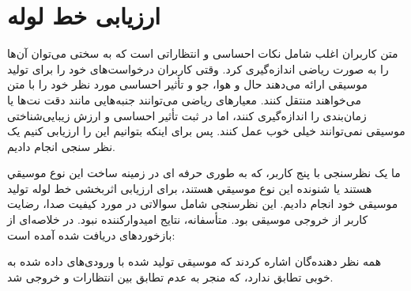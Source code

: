 \section{ارزیابی خط لوله}
متن کاربران اغلب شامل نکات احساسی و انتظاراتی است که به سختی می‌توان آن‌ها را به صورت ریاضی اندازه‌گیری کرد. وقتی کاربران درخواست‌های خود را برای تولید موسیقی ارائه می‌دهند حال و هوا، جو و تأثیر احساسی مورد نظر خود را با متن می‌خواهند منتقل کنند. معیارهای ریاضی می‌توانند جنبه‌هایی مانند دقت نت‌ها یا زمان‌بندی را اندازه‌گیری کنند، اما در ثبت تأثیر احساسی و ارزش زیبایی‌شناختی موسیقی نمی‌توانند خیلی خوب عمل کنند. پس برای اینکه بتوانیم این  را ارزیابی کنیم یک  نظر سنجی انجام دادیم.

ما یک نظرسنجی با پنج کاربر، که به طوری حرفه ای در زمینه ساخت این نوع موسیقي هستند یا شنونده این نوع موسیقي هستند، برای ارزیابی اثربخشی
خط لوله تولید موسیقی خود انجام دادیم. این نظرسنجی شامل سوالاتی در مورد
کیفیت صدا، رضایت کاربر از خروجی موسیقی بود. متأسفانه، نتایج امیدوارکننده
نبود. در  خلاصه‌ای از بازخوردهای دریافت شده آمده است:

\begin{table}
      \centering
      \caption{نتایج نظرسنجی ارزیابی خط لوله}
      \label{tb:result}
\end{table}
همه نظر دهنده‌گان اشاره کردند که موسیقی تولید شده با ورودی‌های داده شده به خوبی
تطابق ندارد، که منجر به عدم تطابق بین انتظارات و خروجی شد.

